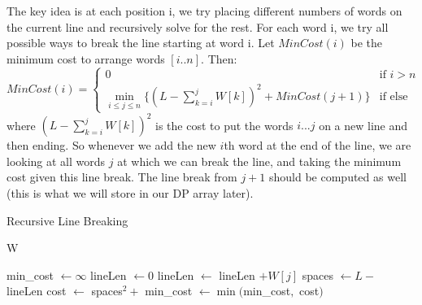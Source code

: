 \documentclass{article}
\begin{document}
    \begin{algo}
      The key idea is at each position i, we try placing different numbers of words on the current line and recursively solve for the rest. For each word i, we try all possible ways to break the line starting at word i. Let $MinCost(i)$ be the minimum cost to arrange words $[i..n]$. Then:
      \begin{equation}
        MinCost(i) = 
        \begin{cases}
          0 & \text{if } i > n \\
          \min_{i \leq j \leq n} \big\{ (L - \sum_{k=i}^j W[k])^2 + MinCost(j+1) \big\} & \text{if else} 
        \end{cases}
      \end{equation}
      where $(L - \sum_{k=i}^j W[k])^2$ is the cost to put the words $i...j$ on a new line and then ending. So whenever we add the new $i$th word at the end of the line, we are looking at all words $j$ at which we can break the line, and taking the minimum cost given this line break. The line break from $j+1$ should be computed as well (this is what we will store in our DP array later). 

      \begin{algorithm}[H]
        \caption{Recursive Line Breaking}
        \label{alg:recline}
        \begin{algorithmic}
          \State W
            
              
              \State {}
            \EndIf

            \State min\_cost $\gets \infty$
            \State lineLen $\gets 0$
              
              \State lineLen $\gets$ lineLen $+ W[j]$
                
                \State spaces $\gets L -$ lineLen  
                \State cost $\gets$ spaces$^2 +$   
                \State min\_cost $\gets \min($min\_cost$,$ cost$)$
              \EndIf
            \EndFor
            \State {}
          \EndFunction
          
          \State {}  
        \end{algorithmic}
      \end{algorithm}
    \end{algo}
\end{document}
